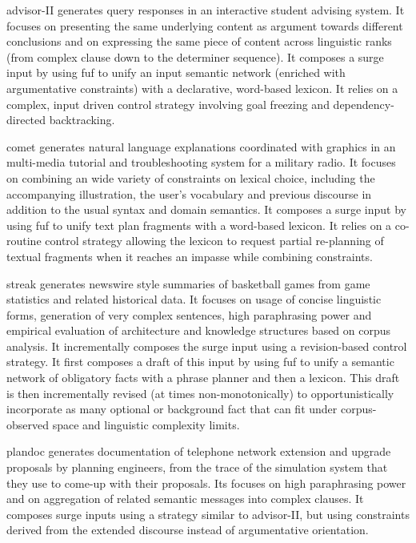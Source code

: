   {\sc advisor-II} \cite{elhadad-phd} generates query responses in an
  interactive student advising system. It focuses on presenting the same
  underlying content as argument towards different conclusions and on
  expressing the same piece of content across linguistic ranks (from
  complex clause down to the determiner sequence). It composes a {\sc
    surge} input by using {\sc fuf} to unify an input semantic network
  (enriched with argumentative constraints) with a declarative, word-based
  lexicon. It relies on a complex, input driven control strategy involving
  goal freezing and dependency-directed backtracking.

{\sc comet} \cite{mckeown-et-al93} generates natural language
  explanations coordinated with graphics in an multi-media tutorial and
  troubleshooting system for a military radio. It focuses on combining an
  wide variety of constraints on lexical choice, including the accompanying
  illustration, the user's vocabulary and previous discourse in addition to
  the usual syntax and domain semantics. It composes a {\sc surge} input by
  using {\sc fuf} to unify text plan fragments with a word-based lexicon.
  It relies on a co-routine control strategy allowing the lexicon to
  request partial re-planning of textual fragments when it reaches an
  impasse while combining constraints.

{\sc streak} \cite{robin-phd} generates newswire style summaries of
  basketball games from game statistics and related historical data. It
  focuses on usage of concise linguistic forms, generation of very complex
  sentences, high paraphrasing power and empirical evaluation of
  architecture and knowledge structures based on corpus analysis. It
  incrementally composes the {\sc surge} input using a revision-based
  control strategy.  It first composes a draft of this input by using {\sc
  fuf} to unify a semantic network of obligatory facts with a phrase
  planner and then a lexicon. This draft is then incrementally revised (at
  times non-monotonically) to opportunistically incorporate as many
  optional or background fact that can fit under corpus-observed space and
  linguistic complexity limits.

{\sc plandoc} \cite{plandoc-walker} generates documentation of telephone
  network extension and upgrade proposals by planning engineers, from the
  trace of the simulation system that they use to come-up with their
  proposals.  Its focuses on high paraphrasing power and on aggregation of
  related semantic messages into complex clauses. It composes {\sc surge}
  inputs using a strategy similar to {\sc advisor-II}, but using
  constraints derived from the extended discourse instead of argumentative
  orientation.

